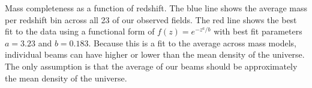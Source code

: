 \label{fig:mass_complete} Mass completeness as a function of redshift. The blue line shows the average mass per redshift bin across all 23 of our observed fields. The red line shows the best fit to the data using a functional form of $f(z) = e^{-z^a / b}$ with best fit parameters $a = 3.23$ and $b = 0.183$. Because this is a fit to the average across mass models, individual beams can have higher or lower than the mean density of the universe. The only assumption is that the average of our beams should be approximately the mean density of the universe.
  